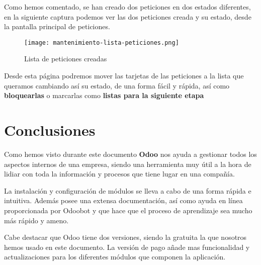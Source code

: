 Como hemos comentado, se han creado dos peticiones en dos estados diferentes, en la siguiente captura podemos ver las dos peticiones creada y su estado, desde la pantalla principal de peticiones.

\begin{figure}[ht]
    \centering
    \texttt{[image: mantenimiento-lista-peticiones.png]}
    \caption{Lista de peticiones creadas}
\end{figure}

\vspace{5ex}
Desde esta página podremos mover las tarjetas de las peticiones a la lista que queramos cambiando así su estado, de una forma fácil y rápida, así como \textbf{bloquearlas} o marcarlas como \textbf{listas para la siguiente etapa}

\section{Conclusiones}
Como hemos visto durante este documento \textbf{Odoo} nos ayuda a gestionar todos los aspectos internos de una empresa, siendo una herramienta muy útil a la hora de lidiar con toda la información y procesos que tiene lugar en una compañía.

La instalación y configuración de módulos se lleva a cabo de una forma rápida e intuitiva. Además posee una extensa documentación, así como ayuda en línea proporcionada por Odoobot y que hace que el proceso de aprendizaje sea mucho más rápido y ameno.

Cabe destacar que Odoo tiene dos versiones, siendo la gratuita la que nosotros hemos usado en este documento. La versión de pago añade mas funcionalidad y actualizaciones para los diferentes módulos que componen la aplicación.

%
%

